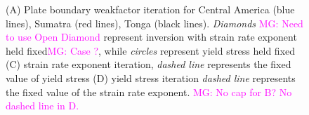 \documentclass[12pt]{article}
\newcommand{\mgnote}[1]{\textcolor{magenta}{MG: #1}}
\begin{document}
\begin{figure}[H]
\centering
\hspace{-0.4cm}
\hspace{-0.1cm}
\hspace{-0.2cm}
\hspace{-0.2cm}
\caption{(A) Plate boundary weakfactor iteration for Central America (blue lines), Sumatra (red lines), Tonga (black lines). \textit{Diamonds} \mgnote{Need to use Open Diamond} represent inversion with strain rate exponent held fixed\mgnote{Case ?}, while \textit{circles} represent yield stress held fixed (C) strain rate exponent iteration, \textit{dashed line} represents the fixed value of yield stress (D) yield stress iteration \textit{dashed line} represents the fixed value of the strain rate exponent.
\mgnote{No cap for B? No dashed line in D.}}
\label{fig:inverse1}
\end{figure}
\end{document}
